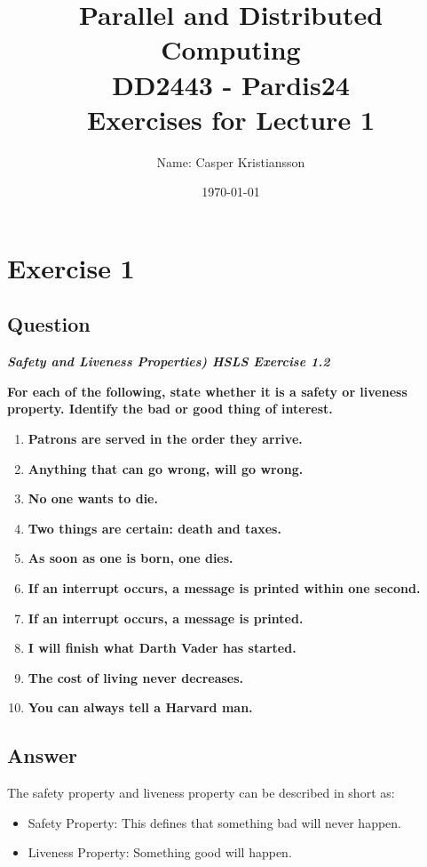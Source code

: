 \documentclass{article}
\title{\textbf{Parallel and Distributed Computing\\DD2443 - Pardis24\\Exercises for Lecture 1}}
\author{Name: Casper Kristiansson}
\date{\today}
\begin{document}
\setlength\parindent{0pt}
\setlength{\parskip}{\bigskipamount}

\maketitle

\section*{Exercise 1}
\subsection*{Question}
\textbf{\textit{Safety and Liveness Properties) HSLS Exercise 1.2}}

\textbf{For each of the following, state whether it is a safety or liveness property. Identify the bad or good thing of interest.}

\begin{enumerate}
    \item \textbf{Patrons are served in the order they arrive.}
    \item \textbf{Anything that can go wrong, will go wrong.}
    \item \textbf{No one wants to die.}
    \item \textbf{Two things are certain: death and taxes.}
    \item \textbf{As soon as one is born, one dies.}
    \item \textbf{If an interrupt occurs, a message is printed within one second.}
    \item \textbf{If an interrupt occurs, a message is printed.}
    \item \textbf{I will finish what Darth Vader has started.}
    \item \textbf{The cost of living never decreases.}
    \item \textbf{You can always tell a Harvard man.}
\end{enumerate}


\subsection*{Answer}
The safety property and liveness property can be described in short as:

\begin{itemize}
    \item Safety Property: This defines that something bad will never happen.
    \item Liveness Property: Something good will happen.
\end{itemize}
\end{document}
